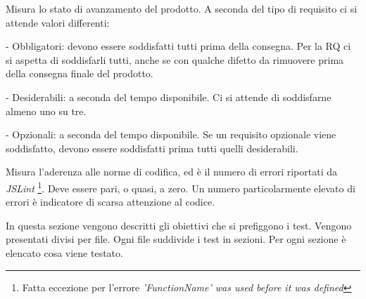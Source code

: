 Misura lo stato di avanzamento del prodotto. A seconda del tipo di requisito ci si attende valori differenti:
\begin{elencopuntato}[\subsecindent]
\item[-] Obbligatori: devono essere soddisfatti tutti prima della consegna. Per la RQ ci si aspetta di soddisfarli tutti, anche se con qualche difetto da rimuovere prima della consegna finale del prodotto.
\item[-] Desiderabili: a seconda del tempo disponibile. Ci si attende di soddisfarne almeno uno su tre.
\item[-] Opzionali: a seconda del tempo disponibile. Se un requisito opzionale viene soddisfatto, devono essere soddisfatti prima tutti quelli desiderabili.
\end{elencopuntato}

Misura l'aderenza alle norme di codifica, ed \`e il numero di errori riportati da \textit{JSLint} \footnote{Fatta eccezione per l'errore \textit{'FunctionName' was used before it was defined}}. Deve essere pari, o quasi, a zero. Un numero particolarmente elevato di errori \`e indicatore di scarsa attenzione al codice.

 

In questa sezione vengono descritti gli obiettivi che si prefiggono i test. Vengono presentati divisi per file. Ogni file suddivide i test in sezioni. Per ogni sezione \`e elencato cosa viene testato.

